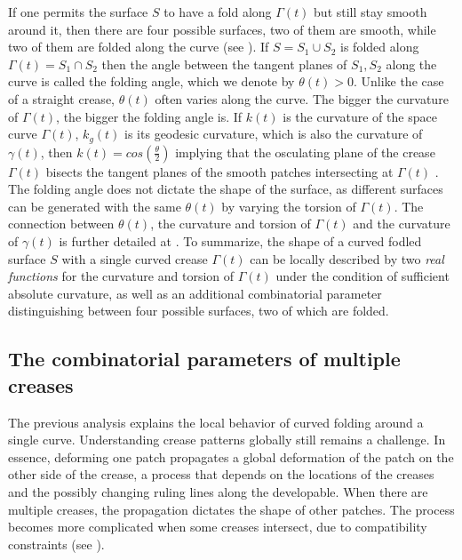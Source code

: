 If one permits the surface $S$ to have a fold along $\Gamma(t)$ but still stay smooth around it, then there are four possible surfaces, two of them are smooth, while two of them are folded along the curve (see ). If $S = S_1 \cup S_2$ is folded along $\Gamma(t) = S_1 \cap S_2$ then the angle between the tangent planes of $S_1,S_2$ along the curve is called the folding angle, which we denote by $\theta(t) > 0$. Unlike the case of a straight crease, $\theta(t)$ often varies along the curve.  The bigger the curvature of $\Gamma(t)$, the bigger the folding angle is. If $k(t)$ is the curvature of the space curve $\Gamma(t)$, $k_g(t)$ is its geodesic curvature, which is also the curvature of $\gamma(t)$, then $k(t) = cos(\frac{\theta}{2})$ implying that the osculating plane of the crease $\Gamma(t)$ bisects the tangent planes of the smooth patches intersecting at $\Gamma(t)$ \cite{curved_folding_kilian,duncan_folded}. The folding angle does not dictate the shape of the surface, as different surfaces can be generated with the same $\theta(t)$ by varying the torsion of $\Gamma(t)$. The connection between $\theta(t)$, the curvature and torsion of $\Gamma(t)$ and the curvature of $\gamma(t)$ is further detailed at \cite{demaine_lens}.
To summarize, the shape of a curved fodled surface $S$ with a single curved crease $\Gamma(t)$ can be locally described by two \textit{real functions} for the curvature and torsion of $\Gamma(t)$ under the condition of sufficient absolute curvature, as well as an additional combinatorial parameter distinguishing between four possible surfaces, two of which are folded.
 
\subsection{The combinatorial parameters of multiple creases}
The previous analysis explains the local behavior of curved folding around a single curve. Understanding crease patterns globally still remains a challenge. In essence, deforming one patch propagates a global deformation of the patch on the other side of the crease, a process that depends on the locations of the creases and the possibly changing ruling lines along the developable. When there are multiple creases, the propagation dictates the shape of other patches. The process becomes more complicated when some creases intersect, due to compatibility constraints (see ). 

